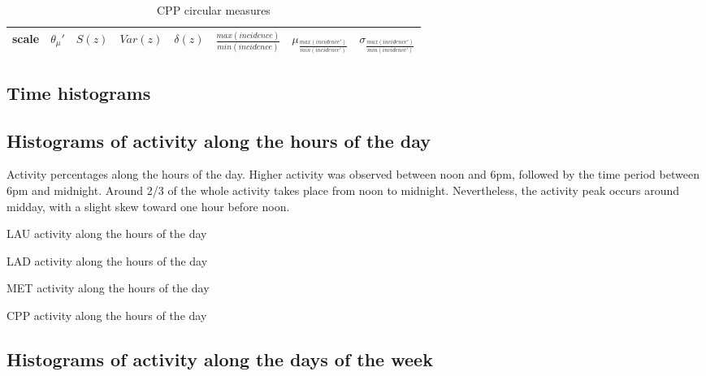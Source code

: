 \documentclass[%
 aip,
 jmp,%
 amsmath,amssymb,
 reprint,%
 floatfix,
]{revtex4-1}
\begin{document}
\begin{table}[!h]
	\caption{CPP circular measures}
\begin{center}
    \begin{tabular}{ |l|| c|c|c|c|c||c|c| }
        \hline
scale & $\theta_\mu'$ & $S(z)$ & $Var(z)$ & $\delta(z)$ & $\frac{max(incidence)}{min(incidence)}$ & $ \mu_{\frac{max(incidence')}{min(incidence')}} $ & $ \sigma_{\frac{max(incidence')}{min(incidence')} } $ \\ \hline\hline
	
    \end{tabular}
\end{center}
\label{tab:circCPP}
\end{table}

\FloatBarrier
\subsection{Time histograms}
\subsection{Histograms of activity along the hours of the day}

Activity percentages along the hours of the day. Higher activity was observed between noon and 6pm, followed by the time period between 6pm and midnight. Around 2/3 of the whole activity takes place from noon to midnight. Nevertheless, the activity peak occurs around midday, with a slight skew toward one hour before noon.
\begin{table}[!h]
	\caption{LAU activity along the hours of the day}
	\footnotesize
	
\end{table}

\begin{table}[!h]
	\caption{LAD activity along the hours of the day}
	\footnotesize
	
\end{table}

\begin{table}[!h]
	\caption{MET activity along the hours of the day}
	\footnotesize
	
\end{table}

\begin{table}[!h]
	\caption{CPP activity along the hours of the day}
	\footnotesize
	
\end{table}

\FloatBarrier
\subsection{Histograms of activity along the days of the week}
\end{document}
